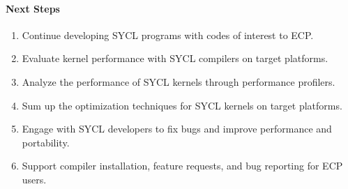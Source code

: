 \paragraph{Next Steps}

\begin{enumerate}
\item Continue developing SYCL programs with codes of interest to ECP.
\item Evaluate kernel performance with SYCL compilers on target platforms.
\item Analyze the performance of SYCL kernels through performance profilers.
\item Sum up the optimization techniques for SYCL kernels on target platforms.
\item Engage with SYCL developers to fix bugs and improve performance and portability. 
\item Support compiler installation, feature requests, and bug reporting for ECP users.
\end{enumerate}

